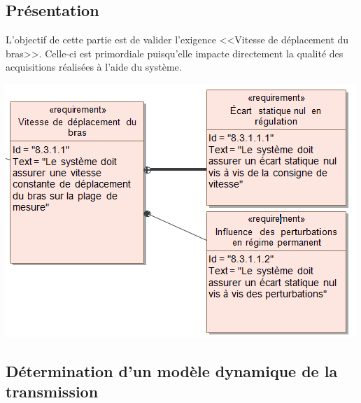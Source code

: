 \documentclass[10pt,fleqn]{article} %
\begin{document}
\subsection{Présentation}

\noindent\begin{minipage}[c]{.6\linewidth}
\begin{obj}
L’objectif de cette partie est de valider l’exigence  <<Vitesse  de déplacement  du bras>>.  Celle-ci est  primordiale  puisqu’elle impacte  directement  la qualité  des acquisitions réalisées à l’aide du système. 
\end{obj}
\end{minipage}\hfill
\begin{minipage}[c]{.35\linewidth}
\begin{center}
\includegraphics[width=\linewidth]{images_01/fig_03}
\end{center}
\end{minipage}

\subsection{Détermination d’un modèle dynamique de la transmission}
\end{document}
